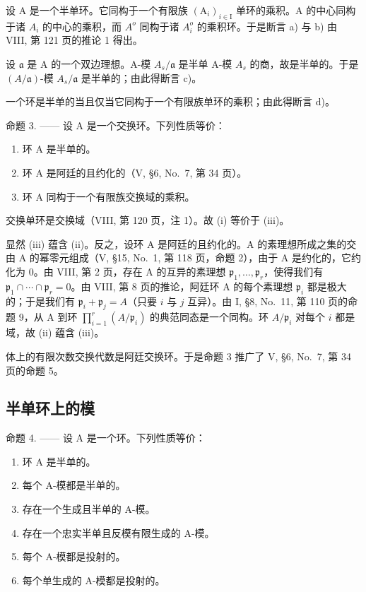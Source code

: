 设 A 是一个半单环。它同构于一个有限族 \((\mathrm{A}_{i})_{i\in\mathrm{I}}\) 单环的乘积。A 的中心同构于诸 \(A_{i}\) 的中心的乘积，而 \(A^{o}\) 同构于诸 \(A_{i}^{o}\) 的乘积环。于是断言 a) 与 b) 由 VIII, 第 121 页的推论 1 得出。

设 \(\mathfrak{a}\) 是 A 的一个双边理想。A-模 \(A_s / \mathfrak{a}\) 是半单 A-模 \(A_s\) 的商，故是半单的。于是 \((A / \mathfrak{a})\)-模 \(A_s / \mathfrak{a}\) 是半单的；由此得断言 c)。

一个环是半单的当且仅当它同构于一个有限族单环的乘积；由此得断言 d)。

命题 3. —— 设 A 是一个交换环。下列性质等价：

\begin{enumerate}
\def\labelenumi{(\roman{enumi})}
\item
  环 A 是半单的。
\item
  环 A 是阿廷的且约化的（V, §6, No.~7, 第 34 页）。
\item
  环 A 同构于一个有限族交换域的乘积。
\end{enumerate}

交换单环是交换域（VIII, 第 120 页，注 1）。故 (i) 等价于 (iii)。

显然 (iii) 蕴含 (ii)。反之，设环 A 是阿廷的且约化的。A 的素理想所成之集的交由 A 的幂零元组成（V, §15, No.~1, 第 118 页，命题 2），由于 A 是约化的，它约化为 0。由 VIII, 第 2 页，存在 A 的互异的素理想 \(\mathfrak{p}_1, \ldots, \mathfrak{p}_r\)，使得我们有 \(\mathfrak{p}_1 \cap \cdots \cap \mathfrak{p}_r = 0\)。由 VIII, 第 8 页的推论，阿廷环 A 的每个素理想 \(\mathfrak{p}_i\) 都是极大的；于是我们有 \(\mathfrak{p}_i + \mathfrak{p}_j = A\)（只要 \(i\) 与 \(j\) 互异）。由 I, §8, No.~11, 第 110 页的命题 9，从 A 到环 \(\prod_{i=1}^{r} (A / \mathfrak{p}_i)\) 的典范同态是一个同构。环 \(A / \mathfrak{p}_i\) 对每个 \(i\) 都是域，故 (ii) 蕴含 (iii)。

体上的有限次数交换代数是阿廷交换环。于是命题 3 推广了 V, §6, No.~7, 第 34 页的命题 5。

\subsection{半单环上的模}

命题 4. —— 设 A 是一个环。下列性质等价：

\begin{enumerate}
\def\labelenumi{(\roman{enumi})}
\item
  环 A 是半单的。
\item
  每个 A-模都是半单的。
\item
  存在一个生成且半单的 A-模。
\item
  存在一个忠实半单且反模有限生成的 A-模。
\item
  每个 A-模都是投射的。
\item
  每个单生成的 A-模都是投射的。
\end{enumerate}

